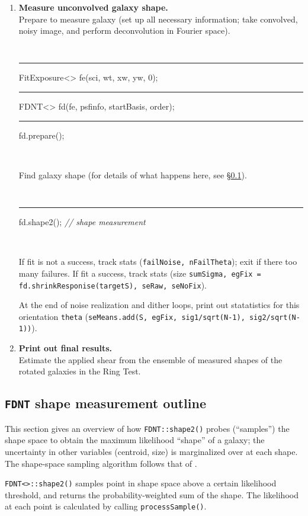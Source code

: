 \documentclass[useAMS,usenatbib,usegraphicx]{mn2e}
\begin{document}
\begin{enumerate}
\item {\bf Measure unconvolved galaxy shape.} \\
Prepare to measure galaxy (set up all necessary information; 
take convolved, noisy image, and perform deconvolution in Fourier space). \\
\begin{boxit}
  {\tt 
   \rule{0.1in}{0in} FitExposure<> fe(sci, wt, xw, yw, 0); \\
   \rule{0.1in}{0in} FDNT<> fd(fe, psfinfo, startBasis, order); \\
   \rule{0.1in}{0in} fd.prepare(); } \\
\end{boxit}
Find galaxy shape (for details of what happens here, see \S\ref{ssec:shape2}). \\
\begin{boxit}
  {\tt 
   \rule{0.1in}{0in} fd.shape2(); {\it // shape measurement}
   } \\
\end{boxit}
If fit is not a success, track stats ({\tt failNoise, nFailTheta}); exit if there too many failures.
If fit a success, track stats (size {\tt sumSigma, egFix = fd.shrinkResponise(targetS),
seRaw, seNoFix}).

At the end of noise realization and dither loops, print out statatistics for this orientation
{\tt theta} ({\tt seMeans.add(S, egFix, sig1/sqrt(N-1), sig2/sqrt(N-1))}). \\
\item {\bf Print out final results.}  \\
Estimate the applied shear from the ensemble of measured shapes of the rotated galaxies 
in the Ring Test.
\end{enumerate}


\subsection{\texttt{FDNT} shape measurement outline}
\label{ssec:shape2}
This section gives an overview of how \texttt{FDNT::shape2()} probes (``samples'') the shape space
to obtain the maximum likelihood ``shape'' of a galaxy;
the uncertainty in other variables (centroid, size) is marginalized over at each shape.
The shape-space sampling algorithm follows that of \citet{miller/etal:2007}.

{\tt FDNT<>::shape2()} samples point in shape space above a certain likelihood threshold, and
returns the probability-weighted sum of the shape.
The likelihood at each point is calculated by calling {\tt processSample()}.
\end{document}
